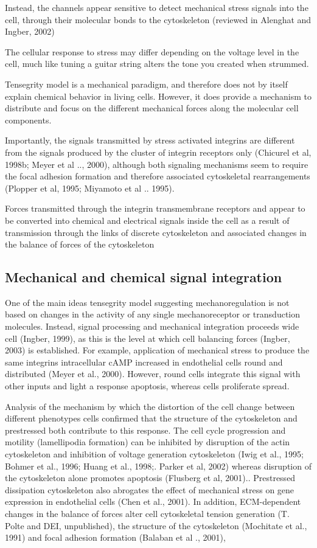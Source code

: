     Instead, the channels appear sensitive to detect mechanical stress signals into the cell, through their molecular bonds to the cytoskeleton (reviewed in Alenghat and Ingber, 2002)

    The cellular response to stress may differ depending on the voltage level in the cell, much like tuning a guitar string alters the tone you created when strummed.

    Tensegrity model is a mechanical paradigm, and therefore does not by itself explain chemical behavior in living cells. However, it does provide a mechanism to distribute and focus on the different mechanical forces along the molecular cell components.

    Importantly, the signals transmitted by stress activated integrins are different from the signals produced by the cluster of integrin receptors only (Chicurel et al, 1998b; Meyer et al .., 2000), although both signaling mechanisms seem to require the focal adhesion formation and therefore associated cytoskeletal rearrangements (Plopper et al, 1995; Miyamoto et al .. 1995).

    Forces transmitted through the integrin transmembrane receptors and appear to be converted into chemical and electrical signals inside the cell as a result of transmission through the links of discrete cytoskeleton and associated changes in the balance of forces of the cytoskeleton

\subsection{Mechanical and chemical signal integration}
    One of the main ideas tensegrity model suggesting mechanoregulation is not based on changes in the activity of any single mechanoreceptor or transduction molecules. Instead, signal processing and mechanical integration proceeds wide cell (Ingber, 1999), as this is the level at which cell balancing forces (Ingber, 2003) is established. For example, application of mechanical stress to produce the same integrins intracellular cAMP increased in endothelial cells round and distributed (Meyer et al., 2000). However, round cells integrate this signal with other inputs and light a response apoptosis, whereas cells proliferate spread.

    Analysis of the mechanism by which the distortion of the cell change between different phenotypes cells confirmed that the structure of the cytoskeleton and prestressed both contribute to this response. The cell cycle progression and motility (lamellipodia formation) can be inhibited by disruption of the actin cytoskeleton and inhibition of voltage generation cytoskeleton (Iwig et al., 1995; Bohmer et al., 1996; Huang et al., 1998;. Parker et al, 2002) whereas disruption of the cytoskeleton alone promotes apoptosis (Flusberg et al, 2001).. Prestressed dissipation cytoskeleton also abrogates the effect of mechanical stress on gene expression in endothelial cells (Chen et al., 2001). In addition, ECM-dependent changes in the balance of forces alter cell cytoskeletal tension generation (T. Polte and DEI, unpublished), the structure of the cytoskeleton (Mochitate et al., 1991) and focal adhesion formation (Balaban et al ., 2001),

